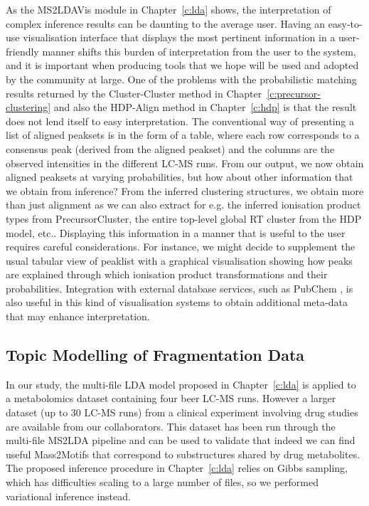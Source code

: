 As the MS2LDAVis module in Chapter~\ref{c:lda} shows, the interpretation of complex inference results can be daunting to the average user. Having an easy-to-use visualisation interface that displays the most pertinent information in a user-friendly manner shifts this burden of interpretation from the user to the system, and it is important when producing tools that we hope will be used and adopted by the community at large. One of the problems with the probabilistic matching results returned by the Cluster-Cluster method in Chapter~\ref{c:precursor-clustering} and also the HDP-Align method in Chapter~\ref{c:hdp} is that the result does not lend itself to easy interpretation. The conventional way of presenting a list of aligned peaksets is in the form of a table, where each row corresponds to a consensus peak (derived from the aligned peakset) and the columns are the observed intensities in the different LC-MS runs. From our output, we now obtain aligned peaksets at varying probabilities, but how about other information that we obtain from inference? From the inferred clustering structures, we obtain more than just alignment as we can also extract for e.g. the inferred ionisation product types from PrecursorCluster, the entire top-level global RT cluster from the HDP model, etc.. Displaying this information in a manner that is useful to the user requires careful considerations. For instance, we might decide to supplement the usual tabular view of peaklist with a graphical visualisation showing how peaks are explained through which ionisation product transformations and their probabilities. Integration with external database services, such as PubChem \cite{bolton2008pubchem}, is also useful in this kind of visualisation systems to obtain additional meta-data that may enhance interpretation. 

\subsection{Topic Modelling of Fragmentation Data}

In our study, the multi-file LDA model proposed in Chapter~\ref{c:lda} is applied to a metabolomics dataset containing four beer LC-MS runs. However a larger dataset (up to 30 LC-MS runs) from a clinical experiment involving drug studies are available from our collaborators. This dataset has been run through the multi-file MS2LDA pipeline and can be used to validate that indeed we can find useful Mass2Motifs that correspond to substructures shared by drug metabolites. The proposed inference procedure in Chapter~\ref{c:lda} relies on Gibbs sampling, which has difficulties scaling to a large number of files, so we performed variational inference \cite{Blei2003} instead.

